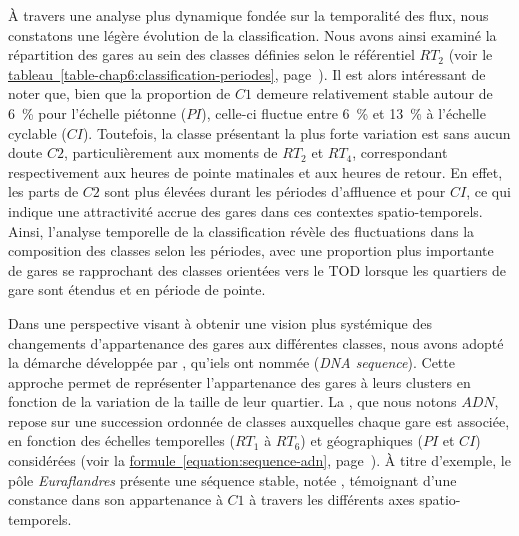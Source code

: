 \begin{refsegment}

À travers une analyse plus dynamique fondée sur la temporalité des flux, nous constatons une légère évolution de la classification. Nous avons ainsi examiné la répartition des gares au sein des classes définies selon le référentiel \(RT_{2}\) (voir le \hyperref[table-chap6:classification-periodes]{tableau~\ref{table-chap6:classification-periodes}}, page~\pageref{table-chap6:classification-periodes}). Il est alors intéressant de noter que, bien que la proportion de \(C1\) demeure relativement stable autour de 6~\% pour l’échelle piétonne (\(PI\)), celle-ci fluctue entre 6~\% et 13~\% à l’échelle cyclable (\(CI\)). Toutefois, la classe présentant la plus forte variation est sans aucun doute \(C2\), particulièrement aux moments de \(RT_{2}\) et \(RT_{4}\), correspondant respectivement aux heures de pointe matinales et aux heures de retour. En effet, les parts de \(C2\) sont plus élevées durant les périodes d’affluence et pour \(CI\), ce qui indique une attractivité accrue des gares dans ces contextes spatio-temporels. Ainsi, l’analyse temporelle de la classification révèle des fluctuations dans la composition des classes selon les périodes, avec une proportion plus importante de gares se rapprochant des classes orientées vers le \acrshort{TOD} lorsque les quartiers de gare sont étendus et en période de pointe.%

Dans une perspective visant à obtenir une vision plus systémique des changements d’appartenance des gares aux différentes classes, nous avons adopté la démarche développée par \textcolor{blue}{\textcite[518]{caset_measuring_2018}}, qu’iels ont nommée  (\textsl{DNA sequence}). Cette approche permet de représenter l’appartenance des gares à leurs clusters en fonction de la variation de la taille de leur quartier. La , que nous notons \(ADN\), repose sur une succession ordonnée de classes auxquelles chaque gare est associée, en fonction des échelles temporelles (\(RT_{1}\) à \(RT_{6}\)) et géographiques (\(PI\) et \(CI\)) considérées (voir la \hyperref[equation:sequence-adn]{formule~\ref{equation:sequence-adn}}, page~\pageref{equation:sequence-adn}). À titre d’exemple, le pôle \textsl{Euraflandres} présente une séquence stable, notée , témoignant d'une constance dans son appartenance à \(C1\) à travers les différents axes spatio-temporels.%


\end{refsegment}

